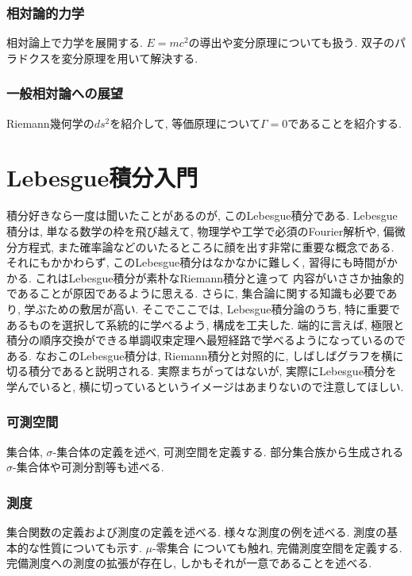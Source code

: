 \documentclass[a4j,dvipdfmx]{jsarticle}
\numberwithin{equation}{section}
\begin{document}
    \section{相対論的力学}
        相対論上で力学を展開する. $E=mc^2$の導出や変分原理についても扱う. 双子のパラドクスを変分原理を用いて解決する.
    \clearpage
    \section{一般相対論への展望}
        Riemann幾何学の$ds^2$を紹介して, 等価原理について$\Gamma=0$であることを紹介する.
    \clearpage

    \part{Lebesgue積分入門}
    \begin{screen}
        積分好きなら一度は聞いたことがあるのが, このLebesgue積分である. Lebesgue積分は, 単なる数学の枠を飛び越えて, 
        物理学や工学で必須のFourier解析や, 偏微分方程式, また確率論などのいたるところに顔を出す非常に重要な概念である.
        それにもかかわらず, このLebesgue積分はなかなかに難しく, 習得にも時間がかかる. これはLebesgue積分が素朴なRiemann積分と違って
        内容がいささか抽象的であることが原因であるように思える. さらに, 集合論に関する知識も必要であり, 学ぶための敷居が高い.
        そこでここでは, Lebesgue積分論のうち, 特に重要であるものを選択して系統的に学べるよう, 構成を工夫した. 
        端的に言えば, 極限と積分の順序交換ができる単調収束定理へ最短経路で学べるようになっているのである.
        なおこのLebesgue積分は, Riemann積分と対照的に, しばしばグラフを横に切る積分であると説明される. 実際まちがってはないが, 
        実際にLebesgue積分を学んでいると, 横に切っているというイメージはあまりないので注意してほしい.
    \end{screen}
    \clearpage
    \section{可測空間}
        集合体, $\sigma$-集合体の定義を述べ, 可測空間を定義する. 部分集合族から生成される$\sigma$-集合体や可測分割等も述べる.
    \clearpage
    \section{測度}
        集合関数の定義および測度の定義を述べる. 様々な測度の例を述べる. 測度の基本的な性質についても示す. $\mu$-零集合
        についても触れ, 完備測度空間を定義する. 完備測度への測度の拡張が存在し, しかもそれが一意であることを述べる.
    \clearpage
\end{document}
